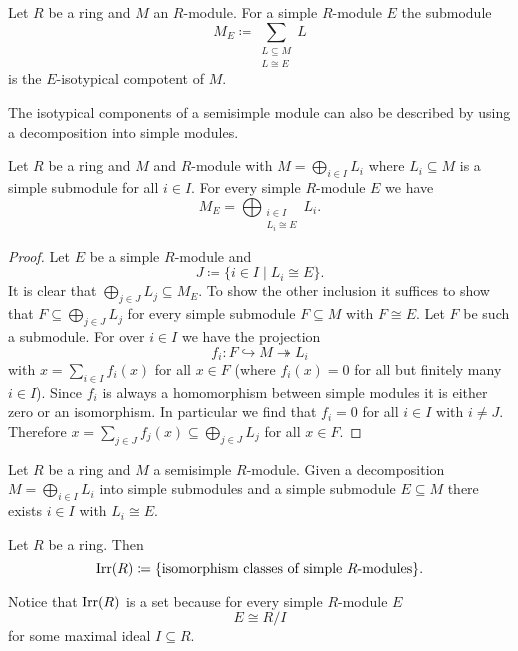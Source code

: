 \begin{defi}
 Let $R$ be a ring and $M$ an $R$-module. For a simple $R$-module $E$ the submodule
 \[
  M_E \coloneqq \sum_{\substack{L \subseteq M \\ L \cong E}} L
 \]
 is the $E$-isotypical compotent of $M$.
\end{defi}


The isotypical components of a semisimple module can also be described by using a decomposition into simple modules.


\begin{lem}\label{lem: isotypical component as direct sum}
 Let $R$ be a ring and $M$ and $R$-module with $M = \bigoplus_{i \in I} L_i$ where $L_i \subseteq M$ is a simple submodule for all $i \in I$. For every simple $R$-module $E$ we have
 \[
  M_E = \bigoplus_{\substack{i \in I \\ L_i \cong E}} L_i.
 \]
\end{lem}
\begin{proof}
 Let $E$ be a simple $R$-module and
 \[
  J \coloneqq \{i \in I \mid L_i \cong E\}.
 \]
 It is clear that $\bigoplus_{j \in J} L_j \subseteq M_E$. To show the other inclusion it suffices to show that $F \subseteq \bigoplus_{j \in J} L_j$ for every simple submodule $F \subseteq M$ with $F \cong E$. Let $F$ be such a submodule. For over $i \in I$ we have the projection
 \[
  f_i \colon F \hookrightarrow M \twoheadrightarrow L_i
 \]
 with $x = \sum_{i \in I} f_i(x)$ for all $x \in F$ (where $f_i(x) = 0$ for all but finitely many $i \in I$). Since $f_i$ is always a homomorphism between simple modules it is either zero or an isomorphism. In particular we find that $f_i = 0$ for all $i \in I$ with $i \neq J$. Therefore $x = \sum_{j \in J} f_j(x) \subseteq \bigoplus_{j \in J} L_j$ for all $x \in F$.
\end{proof}


\begin{cor}
 Let $R$ be a ring and $M$ a semisimple $R$-module. Given a decomposition $M = \bigoplus_{i \in I} L_i$ into simple submodules and a simple submodule $E \subseteq M$ there exists $i \in I$ with $L_i \cong E$.
\end{cor}


\begin{defi}
 Let $R$ be a ring. Then
 \[
  \operatorname{Irr}(R) \coloneqq \{\text{isomorphism classes of simple $R$-modules}\}.
 \]
\end{defi}


Notice that $\operatorname{Irr}(R)$ is a set because for every simple $R$-module $E$
\[
 E \cong R/I
\]
for some maximal ideal $I \subseteq R$.


